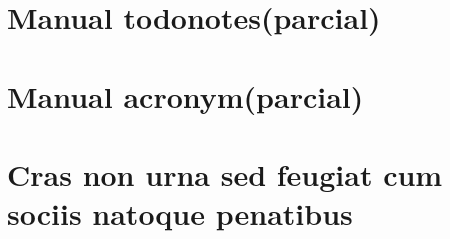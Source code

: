 
\begin{anexosenv}

\partanexos

\chapter{Manual todonotes(parcial)}
\label{manual-todonotes}





\chapter{Manual acronym(parcial)}



\chapter{Cras non urna sed feugiat cum sociis natoque penatibus}


\end{anexosenv}
